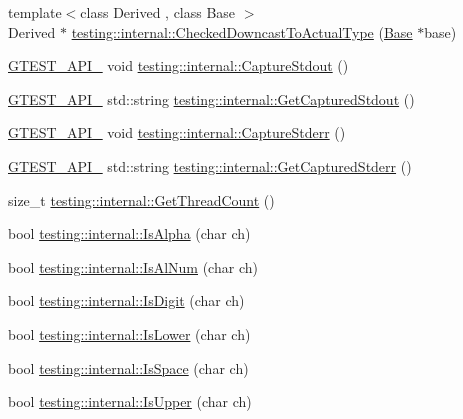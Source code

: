 \begin{DoxyCompactItemize}
\item 
{\footnotesize template$<$class Derived , class Base $>$ }\\Derived $\ast$ \hyperlink{namespacetesting_1_1internal_af54f5cf4d9e03836ecc0316d090cb4ed}{testing\-::internal\-::\-Checked\-Downcast\-To\-Actual\-Type} (\hyperlink{class_base}{Base} $\ast$base)
\item 
\hyperlink{gtest-port_8h_aa73be6f0ba4a7456180a94904ce17790}{G\-T\-E\-S\-T\-\_\-\-A\-P\-I\-\_\-} void \hyperlink{namespacetesting_1_1internal_acba06d4f0343dec407738ba5544af990}{testing\-::internal\-::\-Capture\-Stdout} ()
\item 
\hyperlink{gtest-port_8h_aa73be6f0ba4a7456180a94904ce17790}{G\-T\-E\-S\-T\-\_\-\-A\-P\-I\-\_\-} std\-::string \hyperlink{namespacetesting_1_1internal_aed657219a9856a8d249a3230de0c54ce}{testing\-::internal\-::\-Get\-Captured\-Stdout} ()
\item 
\hyperlink{gtest-port_8h_aa73be6f0ba4a7456180a94904ce17790}{G\-T\-E\-S\-T\-\_\-\-A\-P\-I\-\_\-} void \hyperlink{namespacetesting_1_1internal_a8ec00d458d0d442bd64af7b5f9c22dda}{testing\-::internal\-::\-Capture\-Stderr} ()
\item 
\hyperlink{gtest-port_8h_aa73be6f0ba4a7456180a94904ce17790}{G\-T\-E\-S\-T\-\_\-\-A\-P\-I\-\_\-} std\-::string \hyperlink{namespacetesting_1_1internal_a374156401da17704099d0c33fa53adfb}{testing\-::internal\-::\-Get\-Captured\-Stderr} ()
\item 
size\-\_\-t \hyperlink{namespacetesting_1_1internal_a3b9b3649cd04558bf46c75de52a7ef34}{testing\-::internal\-::\-Get\-Thread\-Count} ()
\item 
bool \hyperlink{namespacetesting_1_1internal_aeb957087fd6bbf9db98ab7cd41b0c129}{testing\-::internal\-::\-Is\-Alpha} (char ch)
\item 
bool \hyperlink{namespacetesting_1_1internal_a83802e7f23324cd512232203662e1a98}{testing\-::internal\-::\-Is\-Al\-Num} (char ch)
\item 
bool \hyperlink{namespacetesting_1_1internal_a4bd96b7fa6486802d33ddc217af55a39}{testing\-::internal\-::\-Is\-Digit} (char ch)
\item 
bool \hyperlink{namespacetesting_1_1internal_ac26ce3883bc8919c27074975e958f3b7}{testing\-::internal\-::\-Is\-Lower} (char ch)
\item 
bool \hyperlink{namespacetesting_1_1internal_af429e04f70f9c10f6aa76a5d1ccd389f}{testing\-::internal\-::\-Is\-Space} (char ch)
\item 
bool \hyperlink{namespacetesting_1_1internal_a84f3baa379fec6bf5947cb5165aa8cc9}{testing\-::internal\-::\-Is\-Upper} (char ch)

\end{DoxyCompactItemize}
